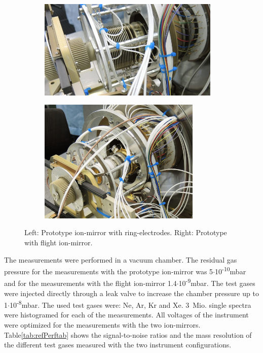 	\begin{figure}[h]
		\begin{subfigure}{0.5\textwidth}
			\centering
			\includegraphics[width = 0.95\textwidth]{Experiments/reflectron_Prototype1.jpg}
		\end{subfigure}
		\begin{subfigure}{0.5\textwidth}
			\centering
			\includegraphics[width = 0.85\textwidth]{Experiments/reflectron_flight.JPG}
		\end{subfigure}
		\caption{Left: Prototype ion-mirror with ring-electrodes. Right: Prototype with flight ion-mirror.}
		\label{fig:ExpRefl}
	\end{figure}
	The measurements were performed in a vacuum chamber. The residual gas pressure for the measurements with the prototype ion-mirror was 5$\cdot$10\textsuperscript{-10}mbar and for the measurements with the flight ion-mirror 1.4$\cdot$10\textsuperscript{-9}mbar. The test gases were injected directly through a leak valve to increase the chamber pressure up to 1$\cdot$10\textsuperscript{-8}mbar. The used test gases were: Ne, Ar, Kr and Xe. 3\, Mio. single spectra were histogramed for each of the measurements. All voltages of the instrument were optimized for the measurements with the two ion-mirrors. Table\ref{tab:refPerftab} shows the signal-to-noise ratios and the mass resolution of the different test gases measured with the two instrument configurations.\\
